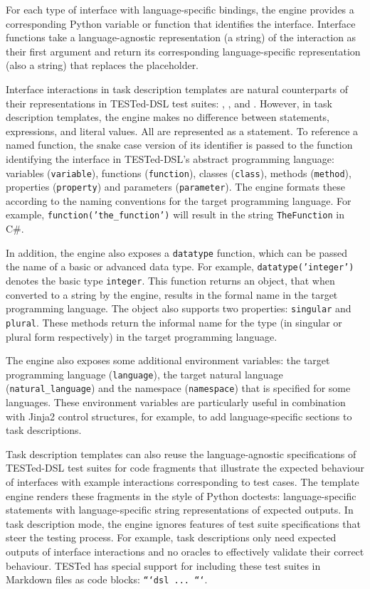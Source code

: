 \documentclass[../main]{subfiles}
\begin{document}
For each type of interface with language-specific bindings, the engine provides a corresponding Python variable or function that identifies the interface.
Interface functions take a language-agnostic representation (a string) of the interaction as their first argument and return its corresponding language-specific representation (also a string) that replaces the placeholder.

Interface interactions in task description templates are natural counterparts of their representations in TESTed-DSL test suites: , , and .
However, in task description templates, the engine makes no difference between statements, expressions, and literal values.
All are represented as a statement.
To reference a named function, the snake case version of its identifier is passed to the function identifying the interface in TESTed-DSL's abstract programming language: variables (\texttt{variable}), functions (\texttt{function}), classes (\texttt{class}), methods (\texttt{method}), properties (\texttt{property}) and parameters (\texttt{parameter}).
The engine formats these according to the naming conventions for the target programming language.
For example, \texttt{function('the_function')} will result in the string \texttt{TheFunction} in C\#.

In addition, the engine also exposes a \texttt{datatype} function, which can be passed the name of a basic or advanced data type.
For example, \texttt{datatype('integer')} denotes the basic type \texttt{integer}.
This function returns an object, that when converted to a string by the engine, results in the formal name in the target programming language.
The object also supports two properties: \texttt{singular} and \texttt{plural}.
These methods return the informal name for the type (in singular or plural form respectively) in the target programming language.

The engine also exposes some additional environment variables: the target programming language (\texttt{language}), the target natural language (\texttt{natural\_language}) and the namespace (\texttt{namespace}) that is specified for some languages.
These environment variables are particularly useful in combination with Jinja2 control structures, for example, to add language-specific sections to task descriptions.

Task description templates can also reuse the language-agnostic specifications of TESTed-DSL test suites for code fragments that illustrate the expected behaviour of interfaces with example interactions corresponding to test cases.
The template engine renders these fragments in the style of Python doctests: language-specific statements with language-specific string representations of expected outputs.
In task description mode, the engine ignores features of test suite specifications that steer the testing process.
For example, task descriptions only need expected outputs of interface interactions and no oracles to effectively validate their correct behaviour.
TESTed has special support for including these test suites in Markdown files as code blocks: \texttt{```dsl ... ```}.
\end{document}
